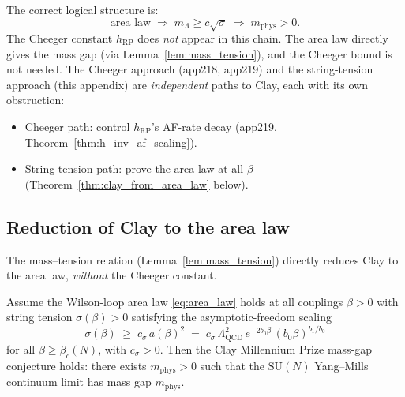 \begin{remark}
\label{rem:correct_implication}
The correct logical structure is:
\[
  \text{area law}
  \;\Rightarrow\;
  m_{\Lambda}\ge c\sqrt{\sigma}
  \;\Rightarrow\;
  m_{\mathrm{phys}}>0.
\]
The Cheeger constant $h_{\mathrm{RP}}$ does \emph{not} appear in
this chain. The area law directly gives the mass gap (via
Lemma~\ref{lem:mass_tension}), and the Cheeger bound is not needed.
The Cheeger approach (app218, app219) and the string-tension
approach (this appendix) are \emph{independent} paths to Clay,
each with its own obstruction:
\begin{itemize}
\item Cheeger path: control $h_{\mathrm{RP}}$'s AF-rate decay
(app219, Theorem~\ref{thm:h_inv_af_scaling}).
\item String-tension path: prove the area law at all $\beta$
(Theorem~\ref{thm:clay_from_area_law} below).
\end{itemize}
\end{remark}

\subsection{Reduction of Clay to the area law}
\label{ssec:clay_to_area_law}

The mass--tension relation (Lemma~\ref{lem:mass_tension}) directly
reduces Clay to the area law, \emph{without} the Cheeger constant.

\begin{theorem}
\label{thm:clay_from_area_law}
Assume the Wilson-loop area law
\eqref{eq:area_law} holds at all couplings $\beta>0$ with string
tension $\sigma(\beta)>0$ satisfying the asymptotic-freedom scaling
\begin{equation}
\label{eq:sigma_af}
  \sigma(\beta)\;\ge\;c_{\sigma}\,a(\beta)^{2}
  \;=\;c_{\sigma}\,\Lambda_{\mathrm{QCD}}^{2}\,
  e^{-2b_{0}\beta}\,(b_{0}\beta)^{b_{1}/b_{0}}
\end{equation}
for all $\beta\ge\beta_{c}(N)$, with $c_{\sigma}>0$. Then the Clay
Millennium Prize mass-gap conjecture holds: there exists
$m_{\mathrm{phys}}>0$ such that the $\mathrm{SU}(N)$ Yang--Mills
continuum limit has mass gap $m_{\mathrm{phys}}$.
\end{theorem}

